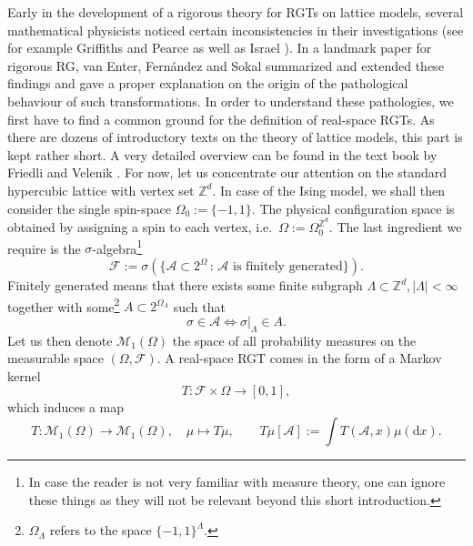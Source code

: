 \documentclass{article}
\begin{document}
Early in the development of a rigorous theory for RGTs on lattice models, several mathematical physicists noticed certain inconsistencies in their investigations (see for example Griffiths and Pearce \cite{Griffiths1979} as well as Israel \cite{Israel1981}). In a landmark paper for rigorous RG, van Enter, Fernández and Sokal \cite{van_Enter_1993} summarized and extended these findings and gave a proper explanation on the origin of the pathological behaviour of such transformations. In order to understand these pathologies, we first have to find a common ground for the definition of real-space RGTs. As there are dozens of introductory texts on the theory of lattice models, this part is kept rather short. A very detailed overview can be found in the text book by Friedli and Velenik \cite{friedli_velenik_2017}. For now, let us concentrate our attention on the standard hypercubic lattice with vertex set $\mathds{Z}^d$. In case of the Ising model, we shall then consider the single spin-space $\Omega_0:=\{-1,1\}$. The physical configuration space is obtained by assigning a spin to each vertex, i.e.\ $\Omega:=\Omega_0^{\mathds{Z}^d}$. The last ingredient we require is the $\sigma$-algebra\footnote{In case the reader is not very familiar with measure theory, one can ignore these things as they will not be relevant beyond this short introduction.}
\begin{equation}
    \mathscr{F}:=\sigma(\{\mathcal{A}\subset 2^\Omega\,:\,\mathcal{A}\,\,\mathrm{is\,\,finitely\,\,generated}\}).
\end{equation}
Finitely generated means that there exists some finite subgraph $\Lambda\subset\mathds{Z}^d,|\Lambda|<\infty$ together with some\footnote{$\Omega_\Lambda$ refers to the space $\{-1,1\}^\Lambda$.} $A\subset2^{\Omega_\Lambda}$ such that
\begin{equation}
    \sigma\in \mathcal{A}\iff\sigma|_\Lambda\in A.
\end{equation}
Let us then denote $\mathscr{M}_1(\Omega)$ the space of all probability measures on the measurable space $(\Omega,\mathscr{F})$. A real-space RGT comes in the form of a Markov kernel
\begin{equation}
    T:\mathscr{F}\times\Omega\to[0,1],
\end{equation}
which induces a map 
\begin{equation}
    T:\mathscr{M}_1(\Omega)\to\mathscr{M}_1(\Omega),\quad\mu\mapsto T\mu,\qquad T\mu[\mathcal{A}]:=\int T(\mathcal{A},x)\mu(\mathrm{d}x).
\end{equation}
\end{document}
